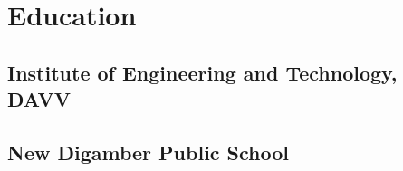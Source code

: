 \documentclass[]{resume}
\begin{document}
\begin{minipage}[t]{0.35\textwidth}
\section{Education} 

\subsection{Institute of Engineering and Technology, DAVV}
\sectionsep

\subsection{New Digamber Public School}
\sectionsep
\sectionsep

%
%

\end{minipage} 
\hfill
\end{document}
